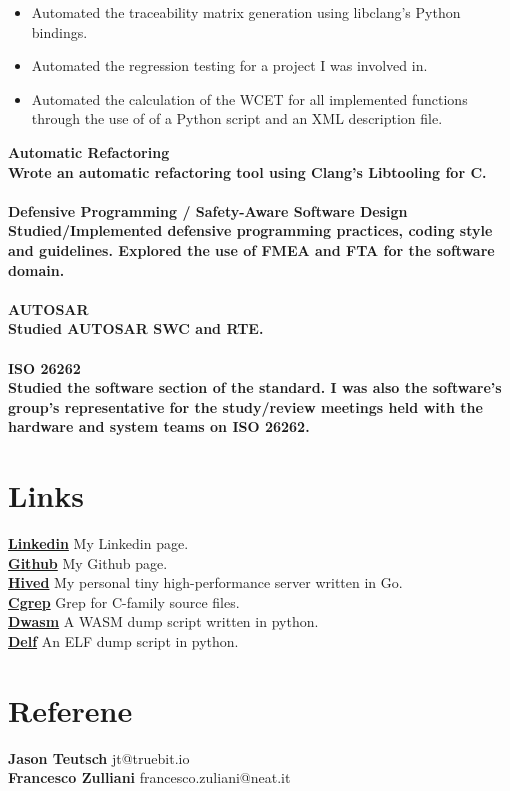 \documentclass[8pt]{article}
\begin{document}
\begin{multicols}{2}
\begin{itemize}
\item Automated the traceability matrix generation using libclang's Python bindings.
\item Automated the regression testing for a project I was involved in.
\item Automated the calculation of the WCET for all implemented functions through the use of of a Python script and an XML description file.
  \end{itemize}
  \bf Automatic Refactoring\\ \normalfont Wrote an automatic refactoring tool using Clang's Libtooling for C.\\[5pt]
  \\
  \bf Defensive Programming / Safety-Aware Software Design\\ \normalfont Studied/Implemented defensive programming practices, coding style and guidelines. Explored the use of FMEA and FTA for the software domain.\\[5pt]
  \\
  \bf AUTOSAR\\ \normalfont Studied AUTOSAR SWC and RTE.\\[5pt]
  \\
  \bf ISO 26262\\ \normalfont Studied the software section of the standard. I was also the software's group's representative for the study/review meetings held with the hardware and system teams on ISO 26262.\\[5pt]

  \section*{Links}
  {\bf \href{https://ir.linkedin.com/in/farzad-sadeghi-08426277}{Linkedin}} My Linkedin page.\\[5pt]
  {\bf \href{https://github.com/terminaldweller}{Github}} My Github page.\\[5pt]
  {\bf \href{https://github.com/terminaldweller/hived}{Hived}} My personal tiny high-performance server written in Go.\\[5pt]
  {\bf \href{https://github.com/terminaldweller/cgrep}{Cgrep}} Grep for C-family source files.\\[5pt]
  {\bf \href{https://github.com/terminaldweller/dwasm}{Dwasm}} A WASM dump script written in python.\\[5pt]
  {\bf \href{https://github.com/terminaldweller/delf}{Delf}} An ELF dump script in python.\\[5pt]

  \section*{Referene}
  {\bf Jason Teutsch} jt@truebit.io\\[5pt]
  {\bf Francesco Zulliani} francesco.zuliani@neat.it\\[5pt]

\end{multicols}
\end{document}
